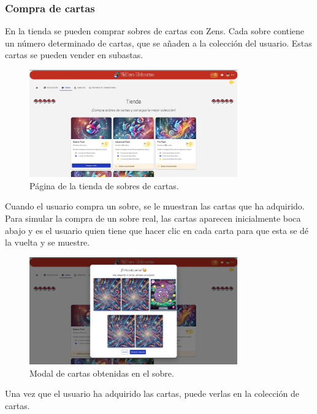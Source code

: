 \begin{enumerate}
\subsubsection{Compra de cartas}
En la tienda se pueden comprar sobres de cartas con Zens.
Cada sobre contiene un número determinado de cartas, que se añaden a la colección del usuario.
Estas cartas se pueden vender en subastas.

\begin{figure}[H]
    \centering
    \includegraphics[width=0.8\textwidth]{figures/6-Analisis/6-Interfaz/interfaz/tienda.png}
    \caption{Página de la tienda de sobres de cartas.}
    \label{fig:m-interfaz-tienda}
\end{figure}

Cuando el usuario compra un sobre, se le muestran las cartas que ha adquirido.
Para simular la compra de un sobre real, las cartas aparecen inicialmente boca abajo y es el usuario quien
tiene que hacer clic en cada carta para que esta se dé la vuelta y se muestre.

\begin{figure}[H]
    \centering
    \includegraphics[width=0.8\textwidth]{figures/6-Analisis/6-Interfaz/interfaz/compra_sobre.png}
    \caption{Modal de cartas obtenidas en el sobre.}
    \label{fig:m-interfaz-sobre-comprado}
\end{figure}

Una vez que el usuario ha adquirido las cartas, puede verlas en la colección de cartas.



\end{enumerate}
